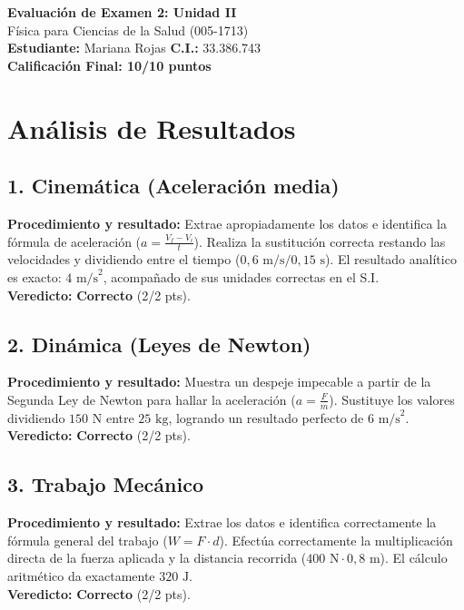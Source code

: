 \documentclass[12pt,letterpaper]{article}
\begin{document}
\begin{center}
    \Large \textbf{Evaluación de Examen 2: Unidad II} \\
    \large Física para Ciencias de la Salud (005-1713) \\
    \vspace{0.5cm}
    \textbf{Estudiante:} Mariana Rojas \quad \textbf{C.I.:} 33.386.743
    \vspace{0.3cm} \\
    \large \textbf{Calificación Final: 10/10 puntos}
\end{center}

\vspace{0.5cm}

\section*{Análisis de Resultados}

\subsection*{1. Cinemática (Aceleración media)}
\textbf{Procedimiento y resultado:} Extrae apropiadamente los datos e identifica la fórmula de aceleración ($a = \frac{V_f - V_i}{t}$). Realiza la sustitución correcta restando las velocidades y dividiendo entre el tiempo ($0,6 \text{ m/s} / 0,15 \text{ s}$). El resultado analítico es exacto: $4 \text{ m/s}^2$, acompañado de sus unidades correctas en el S.I. \\
\textbf{Veredicto:} \textbf{Correcto} (2/2 pts).

\subsection*{2. Dinámica (Leyes de Newton)}
\textbf{Procedimiento y resultado:} Muestra un despeje impecable a partir de la Segunda Ley de Newton para hallar la aceleración ($a = \frac{F}{m}$). Sustituye los valores dividiendo $150 \text{ N}$ entre $25 \text{ kg}$, logrando un resultado perfecto de $6 \text{ m/s}^2$. \\
\textbf{Veredicto:} \textbf{Correcto} (2/2 pts).

\subsection*{3. Trabajo Mecánico}
\textbf{Procedimiento y resultado:} Extrae los datos e identifica correctamente la fórmula general del trabajo ($W = F \cdot d$). Efectúa correctamente la multiplicación directa de la fuerza aplicada y la distancia recorrida ($400 \text{ N} \cdot 0,8 \text{ m}$). El cálculo aritmético da exactamente $320 \text{ J}$. \\
\textbf{Veredicto:} \textbf{Correcto} (2/2 pts).
\end{document}

